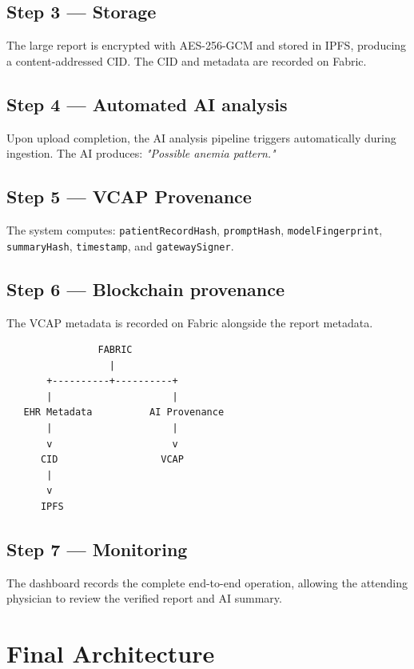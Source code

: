 \documentclass[11pt,a4paper]{article}
\begin{document}
\subsection*{Step 3 --- Storage}
The large report is encrypted with AES-256-GCM and stored in IPFS, producing a content-addressed CID. The CID and metadata are recorded on Fabric.

\subsection*{Step 4 --- Automated AI analysis}
Upon upload completion, the AI analysis pipeline triggers automatically during ingestion. The AI produces: \textit{"Possible anemia pattern."}

\subsection*{Step 5 --- VCAP Provenance}
The system computes: \texttt{patientRecordHash}, \texttt{promptHash}, \texttt{modelFingerprint}, \texttt{summaryHash}, \texttt{timestamp}, and \texttt{gatewaySigner}.

\subsection*{Step 6 --- Blockchain provenance}
The VCAP metadata is recorded on Fabric alongside the report metadata.
\begin{lstlisting}
                FABRIC
                  |
       +----------+----------+
       |                     |
   EHR Metadata          AI Provenance
       |                     |
       v                     v
      CID                  VCAP
       |
       v
      IPFS
\end{lstlisting}

\subsection*{Step 7 --- Monitoring}
The dashboard records the complete end-to-end operation, allowing the attending physician to review the verified report and AI summary.

\newpage
\section{Final Architecture}
\end{document}
